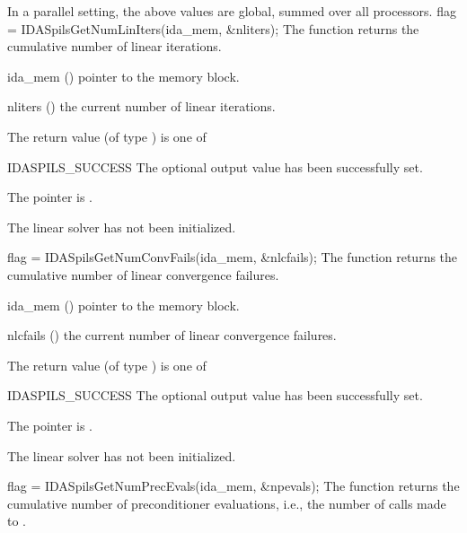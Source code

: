 {{  In a parallel setting, the above values are global, summed over all processors.
}
{
  flag = IDASpilsGetNumLinIters(ida\_mem, \&nliters);
}
{
  The function  returns the
  cumulative number of linear iterations.
}
{
  \begin{args}[nliters]
  \item[ida\_mem] ()
    pointer to the {\ida} memory block.
  \item[nliters] ()
    the current number of linear iterations.
  \end{args}
}
{
  The return value  (of type ) is one of
  \begin{args}
  \item[IDASPILS\_SUCCESS] 
    The optional output value has been successfully set.
  \item[\Id{IDASPILS\_MEM\_NULL}]
    The  pointer is .
  \item[\Id{IDASPILS\_LMEM\_NULL}]
    The {\idaspils} linear solver has not been initialized.
  \end{args}
}
{}
{
  flag = IDASpilsGetNumConvFails(ida\_mem, \&nlcfails);
}
{
  The function  returns the
  cumulative number of linear convergence failures.
}
{
  \begin{args}[nlcfails]
  \item[ida\_mem] ()
    pointer to the {\ida} memory block.
  \item[nlcfails] ()
    the current number of linear convergence failures.
  \end{args}
}
{
  The return value  (of type ) is one of
  \begin{args}
  \item[IDASPILS\_SUCCESS] 
    The optional output value has been successfully set.
  \item[\Id{IDASPILS\_MEM\_NULL}]
    The  pointer is .
  \item[\Id{IDASPILS\_LMEM\_NULL}]
    The {\idaspils} linear solver has not been initialized.
  \end{args}
}
{}
{
  flag = IDASpilsGetNumPrecEvals(ida\_mem, \&npevals);
}
{
  The function  returns the
  cumulative number of preconditioner evaluations, i.e., the number of 
  calls made to .
}}
